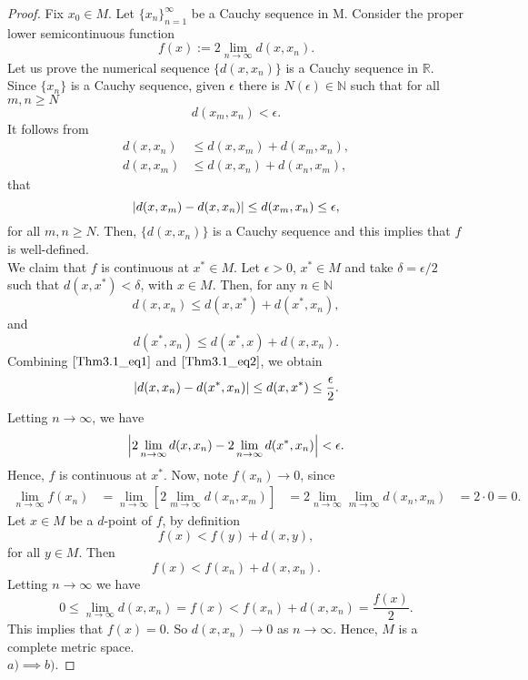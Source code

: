 \begin{proof}
        Fix $x_0 \in M$. Let $\{x_n\}_{n=1}^{\infty}$ be a Cauchy sequence in M.
        Consider the proper lower semicontinuous function
        $$
            f(x) := 2 \lim_{n \to \infty} d(x, x_n).
        $$
        Let us prove the numerical sequence $\{ d(x,x_n)\}$ is a Cauchy sequence
        in $\mathbb{R}$. Since $\{ x_n\}$ is a Cauchy sequence, given $\epsilon$
        there is $N(\epsilon) \in \mathbb{N}$ such that for all $m, n \geq N$
        $$
            d(x_m, x_n) < \epsilon.
        $$
        It follows from 
        \begin{align*}
            d(x, x_n) &\leq d(x,x_m) + d(x_m,x_n), \\
            d(x, x_m) &\leq d(x,x_n) + d(x_n,x_m),
        \end{align*}
        that
        $$
            \left\lvert d(x, x_m) - d(x, x_n)\right\rvert \leq d(x_m, x_n) \leq \epsilon,
        $$
        for all $m, n \geq N$. Then, $\{ d(x, x_n)\}$ is a Cauchy sequence and
        this implies that $f$ is well-defined. \\
        We claim that $f$ is continuous at $x^{*} \in M$. Let  $\epsilon>0$,
        $x^{*} \in M$ and take $\delta = \epsilon /2$ such that $d(x, x^{*})< 
        \delta$,
        with $x \in M$. Then, for any $n \in \mathbb{N}$
        \begin{equation} \label{Thm3.1_eq1}
            d(x, x_n) \leq d(x, x^{*}) + d(x^{*}, x_n),
        \end{equation}
        and
        \begin{equation} \label{Thm3.1_eq2}
            d(x^{*}, x_n) \leq d(x^{*}, x) + d(x, x_n).
        \end{equation}
        Combining $\eqref{Thm3.1_eq1}$ and $\eqref{Thm3.1_eq2}$, we obtain
        $$
            \left\lvert d(x,x_n) - d(x^{*}, x_n)\right\rvert \leq d(x, x^{*}) \leq 
            \frac{\epsilon}{2}.
        $$
        Letting $n \to \infty$, we have 
        $$
            \abs{2\lim_{n \to \infty} d(x, x_n) - 2\lim_{n \to \infty} d(x^{*}, 
            x_n)} %
            < \epsilon.
        $$
        Hence, $f$ is continuous at $x^{*}$. Now, note $f(x_n) \to 0$, since
        \begin{align*}
            \lim_{n \to \infty} f(x_n) 
            &= 
                \lim_{n \to \infty} \left[2 \lim_{m \to \infty} d(x_n, x_m) 
                \right]
            &= 2 \lim_{n \to \infty} \lim_{m \to \infty} d(x_n, x_m)
            &= 2 \cdot 0 = 0.
        \end{align*}
        Let $x \in M$ be a $d$-point of $f$, by definition 
        $$
            f(x) < f(y) + d(x, y),
        $$
        for all $y \in M$. Then 
        $$
            f(x) < f(x_n) + d(x, x_n).
        $$
        Letting $n \to \infty $ we have
        $$
            0 \leq \lim_{n \to \infty} d(x, x_n) = f(x) < f(x_n) + d(x, x_n) = %
                \frac{f(x)}{2}.
        $$
        This implies that $f(x) = 0$. So $d(x, x_n) \to 0$ as $n \to \infty$. 
        Hence, $M$ is a complete metric space. \\
        $a) \implies b)$.
    \end{proof}
